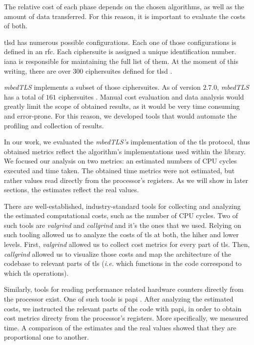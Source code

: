 The relative cost of each phase depends on the chosen algorithms, as well as the amount of data
transferred. For this reason, it is important to evaluate the costs of both.

\acrshort{tlsd} has numerous possible configurations. Each one of those configurations is defined
in an \gls{rfc}. Each ciphersuite is assigned a unique identification number. \gls{iana} is responsible for
maintaining the full list of them. At the moment of this writing, there are over $300$ ciphersuites
defined for \gls{tlsd} \cite{IANA_ciphers_list:online}.

\textit{mbedTLS} implements a subset of those ciphersuites. As of version $2.7.0$, \textit{mbedTLS}
has a total of $161$ ciphersuites \cite{mbedTLS_ciphers_list:online}. Manual cost evaluation and
data analysis would greatly limit the scope of obtained results, as it would be very time consuming
and error-prone. For this reason, we developed tools that would automate the profiling and collection
of results.

In our work, we evaluated the \textit{mbedTLS's} implementation of the \gls{tls} protocol, thus obtained
metrics reflect the algorithm's implementations used within the library. 
We focused our analysis on two metrics: an estimated numbers of CPU cycles executed and time taken.
The obtained time metrics were not estimated, but rather values read directly from the processor's registers.
As we will show in later sections, the estimates reflect the real values.

There are well-established, industry-standard tools for collecting and analyzing the estimated computational costs,
such as the number of CPU cycles. Two of such tools are \textit{valgrind} and \textit{callgrind} and it's the ones that we used. 
Relying on such tooling allowed us to analyze the costs of \gls{tls} at both, the hiher and lower levels.
First, \textit{valgrind} allowed us to collect cost metrics for every part of \gls{tls}. Then, \textit{callgrind}
allowed us to visualize those costs and map the architecture of the codebase to relevant parts of \gls{tls} (\textit{i.e.}
which functions in the code correspond to which \gls{tls} operations).

Similarly, tools for reading performance related hardware counters directly from the processor exist. 
One of such tools is \gls{papi} \cite{dongarra2001using}.
After analyzing the estimated costs, we instructed the relevant parts of the code with \gls{papi}, in order to obtain
cost metrics directy from the processor's registers. More specifically, we measured time. A comparison of the estimates
and the real values showed that they are proportional one to another. 

